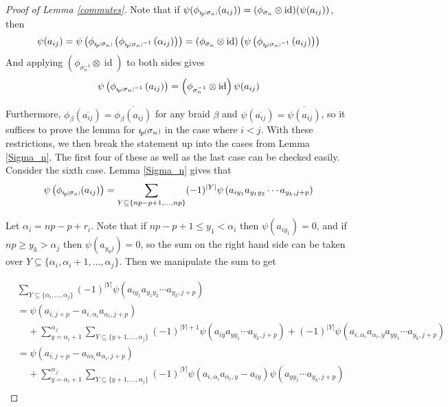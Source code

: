 \documentclass[11pt]{amsart}
\def\s{{\sigma}}
\def\a{\alpha}
\newcommand*{\smallp}[1]{\scalebox{.75}{\ensuremath#1}}
\newcommand*{\subsmallp}[1]{\scalebox{.5}{\ensuremath#1}}
\newcommand{\pp}[2][p]{\imath_{\hspace*{-1pt}#1}\hspace*{-.5pt}\smallp(#2\smallp)}
\newcommand{\subpp}[2][p]{\imath_{\hspace*{-1pt}#1}\hspace*{-.5pt}\subsmallp(#2\subsmallp)}
\newcommand\id{\operatorname{id}}
\theoremstyle{definition}
\begin{document}
\begin{proof} [Proof of Lemma \ref{commutes}]
Note that if $\psi(\phi_{\subpp{\s_n}}(a_{ij})) = (\phi_{\s_n} \otimes \id)(\psi(a_{ij}))$, then
$$\psi(a_{ij}) = \psi\left(\phi_{\subpp{\s_n}}\left(\phi_{\subpp{\s_n}^{-1}}\left(\a_{ij}\right)\right)\right) =  \left(\phi_{\s_n}\otimes\id\right)\left(\psi\left(\phi_{\subpp{\s_n}^{-1}}\left(a_{ij}\right)\right)\right) $$
And applying $\left(\phi_{\s_n^{-1}}\otimes\id\right)$ to both sides gives
$$\psi\left(\phi_{\subpp{\s_n}^{-1}}\left(a_{ij}\right)\right) = \left(\phi_{\s_n^{-1}}\otimes\id\right)\psi(a_{ij})$$

Furthermore, $\phi_\beta(\overline{a_{ij}}) = \overline{\phi_\beta(a_{ij})}$ for any braid $\beta$ and $\psi(\overline{a_{ij}}) = \overline{\psi(a_{ij})}$, so it suffices to prove the lemma for $\pp{\s_n}$ in the case where $i<j$.  With these restrictions, we then break the statement up into the cases from Lemma \ref{Sigma_n}.  The first four of these as well as the last case can be checked easily.  Consider the sixth case.  Lemma \ref{Sigma_n} gives that
$$\psi\left(\phi_{\subpp{\s_n}}(a_{ij})\right) = \sum_{Y\subseteq \{np-p+1,\ldots,np\}}(-1)^{|Y|}\psi\left(a_{iy_1}a_{y_1y_2}\cdots a_{y_k,j+p}\right)$$


Let $\a_i  = np-p+r_i$.  Note that if $np-p+1\le y_1<\a_i$ then $\psi(a_{iy_1}) = 0$, and if $np \ge y_k>\a_j$ then $\psi(a_{y_kj}) = 0$, so the sum on the right hand side can be taken over $Y\subseteq\{\a_i,\a_i+1,\ldots,\a_j\}$.  Then we manipulate the sum to get

\begin{align*}
& \sum_{Y\subseteq \{\a_i,\ldots,\a_j\}}(-1)^{|Y|}\psi\left(a_{iy_1}a_{y_1y_2}\cdots a_{y_k,j+p}\right)\\
&= \psi\left(a_{i,j+p} - a_{i,\a_i}a_{\a_i,j+p}\right)\\
& \;\;\;\;+ \sum_{y=\a_i+1}^{\a_j}\sum_{Y\subseteq \{y+1,\ldots,\a_j\}}(-1)^{|Y|+1}\psi\left(a_{iy}a_{yy_1}\cdots a_{y_k,j+p}\right) + (-1)^{|Y|}\psi\left(a_{i,\a_i}a_{\a_i,y}a_{yy_1}\cdots a_{y_k,j+p}\right)\\
&= \psi\left(a_{i,j+p} - a_{i\a_i}a_{\a_i,j+p}\right)\\
& \;\;\;\;+ \sum_{y=\a_i+1}^{\a_j}\sum_{Y\subseteq \{y+1,\ldots,\a_j\}}(-1)^{|Y|}\psi\left(a_{i,\a_i}a_{\a_i,y} - a_{iy}\right)\psi\left(a_{yy_1}\cdots a_{y_k,j+p}\right)\\
\end{align*}




\end{proof}
\end{document}
